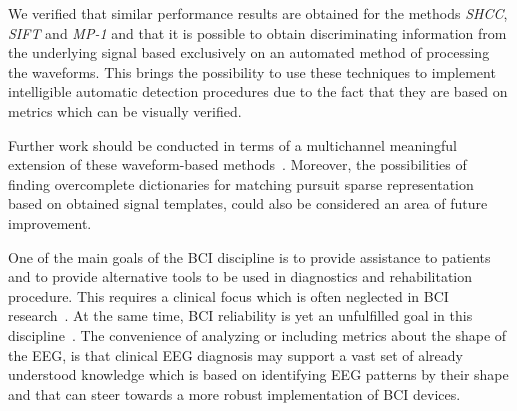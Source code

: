 \documentclass[brainsci,article,submit,moreauthors,pdftex,10pt,a4paper]{mdpi}
\begin{document}
We verified that similar performance results are obtained for the methods \textit{SHCC}, \textit{SIFT} and \textit{MP-1} and that it is possible to obtain discriminating information from the underlying signal based exclusively on an automated method of processing the waveforms.  This brings the possibility to use these techniques to implement intelligible automatic detection procedures due to the fact that they are based on metrics which can be visually verified.  

Further work should be conducted in terms of a multichannel meaningful extension of these waveform-based methods~\citep{Gribonval2008}. Moreover, the possibilities of finding overcomplete dictionaries for matching pursuit sparse representation based on obtained signal templates, could also be considered an area of future improvement.


One of the main goals of the BCI discipline is to provide assistance to patients and to provide alternative tools to be used in diagnostics and rehabilitation procedure.  This requires a clinical focus which is often neglected in BCI research~\citep{Chavarriaga2017}.  At the same time, BCI reliability is yet an unfulfilled goal in this discipline~\citep{WolpawJonathanR2012}. The convenience of analyzing or including metrics about the shape of the EEG, is that clinical EEG diagnosis may support a vast set of already understood knowledge which is based on identifying EEG patterns by their shape and that can steer towards a more robust implementation of BCI devices.

\end{document}

